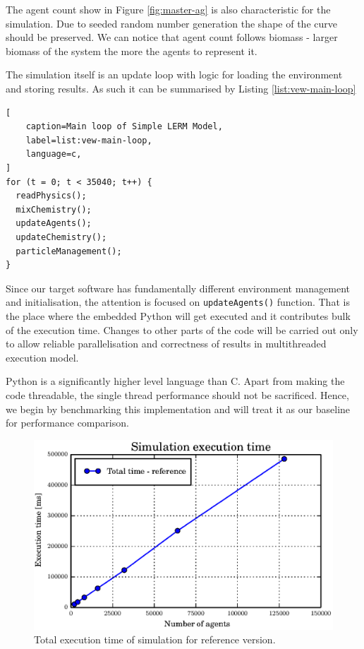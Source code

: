 \documentclass[12pt, a4paper]{report}
\begin{document}
The agent count show in Figure \ref{fig:master-ag} is also characteristic
for the simulation. Due to seeded random number generation the shape of
the curve should be preserved. We can notice that agent count follows biomass
- larger biomass of the system the more the agents to  represent it.

The simulation itself is an update loop with logic for loading the
environment and storing results. As such it can be summarised by
Listing \ref{list:vew-main-loop}

\begin{lstlisting}[
    caption=Main loop of Simple LERM Model,
    label=list:vew-main-loop,
    language=c,
]
for (t = 0; t < 35040; t++) {
  readPhysics();
  mixChemistry();
  updateAgents();
  updateChemistry();
  particleManagement();
}
\end{lstlisting}

Since our target software has fundamentally different environment management
and initialisation, the attention is focused on \lstinline{updateAgents()}
function. That is the place where the embedded Python will get executed
and it contributes bulk of the execution time. Changes to other parts
of the code will be carried out only to allow reliable parallelisation
and correctness of results in multithreaded execution model.

Python is a significantly higher level language than C. Apart from making
the code threadable, the single thread performance should not be sacrificed.
Hence, we begin by benchmarking this implementation and will treat it as
our baseline for performance comparison.

\begin{figure}[H]
  \begin{center}
    \includegraphics[width=\columnwidth]{graphs/master-perf.eps}
    \caption{Total execution time of simulation for reference version.}
    \label{fig:master-perf}
  \end{center}
\end{figure}
\end{document}
